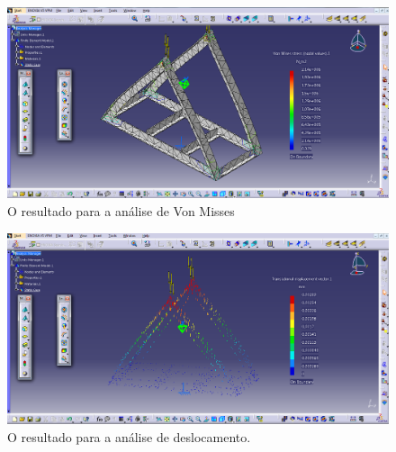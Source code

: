 \begin{figure}[h]
\centering
\includegraphics[scale=0.4]{figuras/vonmisses.png}
\caption{O resultado para a análise de Von Misses}
\label{resultado-simulacao}
\end{figure}

\begin{figure}[h]
\centering
\includegraphics[scale=0.4]{figuras/deslocamento.png}
\caption{O resultado para a análise de deslocamento.}
\label{analise-deslocamento}
\end{figure}
